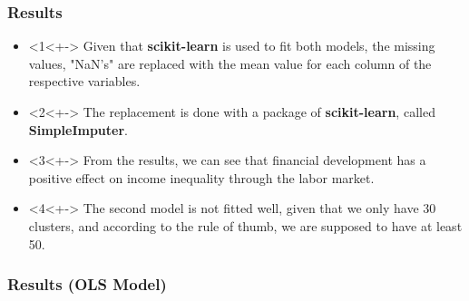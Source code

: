 \documentclass[11pt]{beamer}
\begin{document}
\begin{frame}
\frametitle{Results}
\begin{itemize}
\item<1<+-> Given that \textbf{scikit-learn} is used to fit both models, the missing values, "NaN's" are replaced with the mean value for each column of the respective variables.
\item<2<+-> The replacement is done with a package of \textbf{scikit-learn}, called \textbf{SimpleImputer}.
\item<3<+-> From the results, we can see that financial development has a positive effect on income inequality through the labor market.
\item<4<+-> The second model is not fitted well, given that we only have 30 clusters, and according to the rule of thumb, we are supposed to have at least 50.
\end{itemize}
\end{frame}

\begin{frame}
\frametitle{Results (OLS Model)}
\end{frame}
\end{document}
